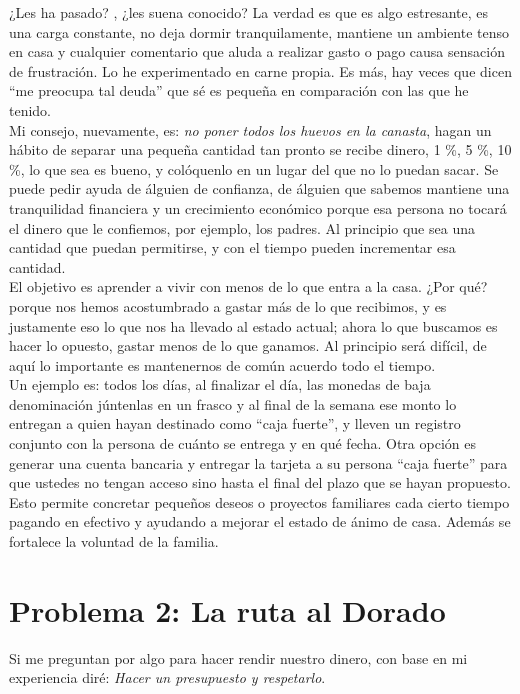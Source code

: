 \documentclass[12pt]{book} %
\begin{document}
¿Les ha pasado? , ¿les suena conocido? La verdad es que es algo estresante, es una carga constante, no deja dormir tranquilamente, mantiene un ambiente tenso en casa y cualquier comentario que aluda a realizar gasto o pago causa sensación de frustración. Lo he experimentado en carne propia. Es más, hay veces que dicen ``me preocupa tal deuda'' que sé es pequeña en comparación con las que he tenido.\\

Mi consejo, nuevamente, es: \emph{no poner todos los huevos en la canasta}, hagan un hábito de separar una pequeña cantidad tan pronto se recibe dinero, 1 \%, 5 \%, 10 \%, lo que sea es bueno, y colóquenlo en un lugar del que no lo puedan sacar. Se puede pedir ayuda de álguien de confianza, de álguien que sabemos mantiene una tranquilidad financiera y un crecimiento económico porque esa persona no tocará el dinero que le confiemos, por ejemplo, los padres. Al principio que sea una cantidad que puedan permitirse, y con el tiempo pueden incrementar esa cantidad.\\

El objetivo es aprender a vivir con menos de lo que entra a la casa. ¿Por qué? porque nos hemos acostumbrado a gastar más de lo que recibimos, y es justamente eso lo que nos ha llevado al estado actual; ahora lo que buscamos es hacer lo opuesto, gastar menos de lo que ganamos. Al principio será difícil, de aquí lo importante es mantenernos de común acuerdo todo el tiempo.\\

Un ejemplo es: todos los días, al finalizar el día, las monedas de baja denominación júntenlas en un frasco y al final de la semana ese monto lo entregan a quien hayan destinado como ``caja fuerte'', y lleven un registro conjunto con la persona de cuánto se entrega y en qué fecha. Otra opción es generar una cuenta bancaria y entregar la tarjeta a su persona ``caja fuerte'' para que ustedes no tengan acceso sino hasta el final del plazo que se hayan propuesto.\\

Esto permite concretar pequeños deseos o proyectos familiares cada cierto tiempo pagando en efectivo y ayudando a mejorar el estado de ánimo de casa. Además se fortalece la voluntad de la familia.\\

\chapter[La ruta al Dorado]{Problema 2: La ruta al Dorado}
Si me preguntan por  algo para hacer rendir nuestro dinero, con base en mi experiencia diré: \emph{Hacer un presupuesto y respetarlo}.\\
\end{document}

